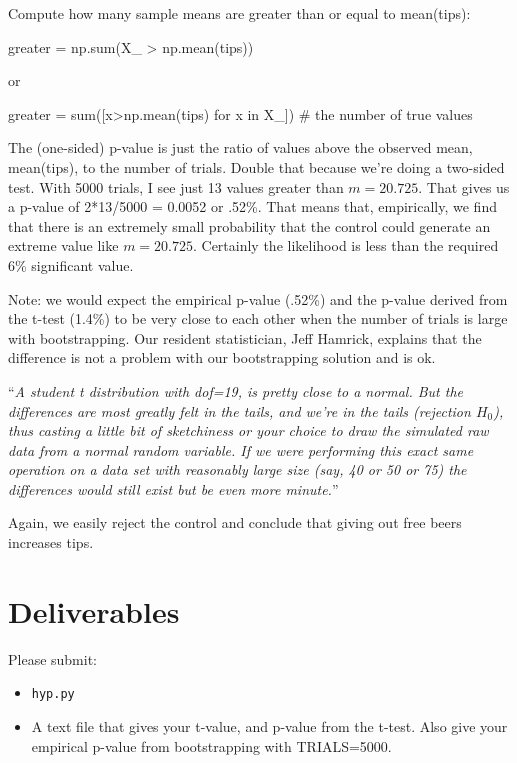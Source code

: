 \begin{fullwidth}
\step Compute how many sample means are greater than or equal to mean(tips):

\begin{pyverbatim}
greater = np.sum(X_ > np.mean(tips))
\end{pyverbatim}

or

\begin{pyverbatim}
greater = sum([x>np.mean(tips) for x in X_]) # the number of true values
\end{pyverbatim}

\step The (one-sided) p-value is just the ratio of values above the observed mean, mean(tips), to the number of trials. Double that because we're doing a two-sided test. With 5000 trials, I see just 13 values greater than $m=20.725$. That gives us a p-value of 2*13/5000 = 0.0052 or .52\%. That means that, empirically, we find that there is an extremely small probability that the control could generate an extreme value like $m=20.725$. Certainly the likelihood is less than the required 6\% significant value. 

Note: we would expect the empirical p-value (.52\%) and the p-value derived from the t-test (1.4\%) to be very close to each other when the number of trials is large with bootstrapping.  Our resident statistician, Jeff Hamrick, explains that the difference is not a problem with our bootstrapping solution and is ok.

``{\em A student t distribution with dof=19, is pretty close to a normal. But the differences are most greatly felt in the tails, and we're in the tails (rejection $H_{0}$), thus casting a little bit of sketchiness or your choice to draw the simulated raw data from a normal random variable. If we were performing this exact same operation on a data set with reasonably large size (say, 40 or 50 or 75) the differences would still exist but be even more minute.}''

Again, we easily reject the control and conclude that giving out free beers increases tips.

\section{Deliverables}

Please submit:

\begin{itemize}
\item {\tt hyp.py}
\item A text file that gives your t-value, and p-value from the t-test. Also give your empirical p-value from bootstrapping with TRIALS=5000.
\end{itemize}

\end{fullwidth}
